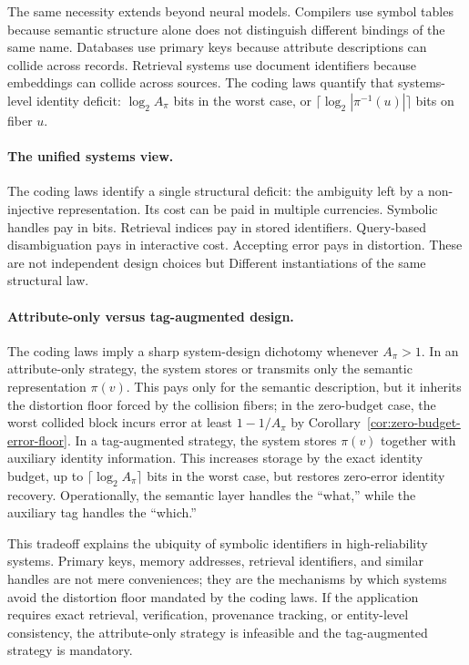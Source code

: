 The same necessity extends beyond neural models. Compilers use symbol tables because semantic structure alone does not distinguish different bindings of the same name. Databases use primary keys because attribute descriptions can collide across records. Retrieval systems use document identifiers because embeddings can collide across sources. The coding laws quantify that systems-level identity deficit: $\log_2 A_\pi$ bits in the worst case, or $\lceil \log_2 |\pi^{-1}(u)| \rceil$ bits on fiber $u$.

\paragraph{The unified systems view.}
The coding laws identify a single structural deficit: the ambiguity left by a non-injective representation. Its cost can be paid in multiple currencies. Symbolic handles pay in bits. Retrieval indices pay in stored identifiers. Query-based disambiguation pays in interactive cost. Accepting error pays in distortion. These are not independent design choices but Different instantiations of the same structural law.

\paragraph{Attribute-only versus tag-augmented design.}
The coding laws imply a sharp system-design dichotomy whenever $A_\pi>1$. In an attribute-only strategy, the system stores or transmits only the semantic representation $\pi(v)$. This pays only for the semantic description, but it inherits the distortion floor forced by the collision fibers; in the zero-budget case, the worst collided block incurs error at least $1-1/A_\pi$ by Corollary~\ref{cor:zero-budget-error-floor}. In a tag-augmented strategy, the system stores $\pi(v)$ together with auxiliary identity information. This increases storage by the exact identity budget, up to $\lceil \log_2 A_\pi \rceil$ bits in the worst case, but restores zero-error identity recovery. Operationally, the semantic layer handles the ``what,'' while the auxiliary tag handles the ``which.''

This tradeoff explains the ubiquity of symbolic identifiers in high-reliability systems. Primary keys, memory addresses, retrieval identifiers, and similar handles are not mere conveniences; they are the mechanisms by which systems avoid the distortion floor mandated by the coding laws. If the application requires exact retrieval, verification, provenance tracking, or entity-level consistency, the attribute-only strategy is infeasible and the tag-augmented strategy is mandatory.

